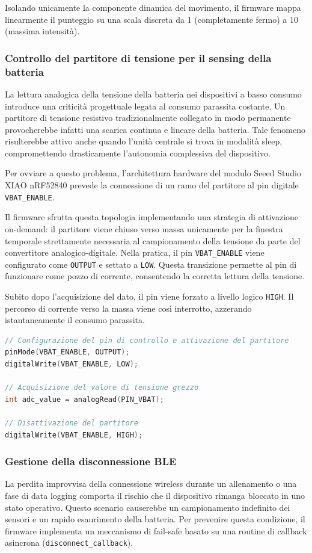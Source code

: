 Isolando unicamente la componente dinamica del movimento, il firmware mappa linearmente il punteggio su una scala discreta da 1 (completamente fermo) a 10 (massima intensità).

\subsubsection{Controllo del partitore di tensione per il sensing della batteria}
La lettura analogica della tensione della batteria nei dispositivi a basso consumo introduce una criticità progettuale legata al consumo parassita costante.
Un partitore di tensione resistivo tradizionalmente collegato in modo permanente provocherebbe infatti una scarica continua e lineare della batteria.
Tale fenomeno risulterebbe attivo anche quando l'unità centrale si trova in modalità sleep, compromettendo drasticamente l'autonomia complessiva del dispositivo.

Per ovviare a questo problema, l'architettura hardware del modulo Seeed Studio XIAO nRF52840 prevede la connessione di un ramo del partitore al pin digitale \texttt{VBAT\_ENABLE}.

Il firmware sfrutta questa topologia implementando una strategia di attivazione on-demand: il partitore viene chiuso verso massa unicamente per la finestra temporale strettamente necessaria al campionamento della tensione da parte del convertitore analogico-digitale.
Nella pratica, il pin \texttt{VBAT\_ENABLE} viene configurato come \texttt{OUTPUT} e settato a \texttt{LOW}. Questa transizione permette al pin di funzionare come pozzo di corrente, consentendo la corretta lettura della tensione.

Subito dopo l'acquisizione del dato, il pin viene forzato a livello logico \texttt{HIGH}. Il percorso di corrente verso la massa viene così interrotto, azzerando istantaneamente il consumo parassita.

\begin{lstlisting}[language=C++, caption={Implementazione software della lettura della tensione della batteria.}]
// Configurazione del pin di controllo e attivazione del partitore
pinMode(VBAT_ENABLE, OUTPUT);
digitalWrite(VBAT_ENABLE, LOW);

// Acquisizione del valore di tensione grezzo
int adc_value = analogRead(PIN_VBAT);

// Disattivazione del partitore
digitalWrite(VBAT_ENABLE, HIGH);
\end{lstlisting}

\subsubsection{Gestione della disconnessione BLE}
La perdita improvvisa della connessione wireless durante un allenamento o una fase di data logging comporta il rischio che il dispositivo rimanga bloccato in uno stato operativo. Questo scenario causerebbe un campionamento indefinito dei sensori e un rapido esaurimento della batteria.
Per prevenire questa condizione, il firmware implementa un meccanismo di fail-safe basato su una routine di callback asincrona (\texttt{disconnect\_callback}).

